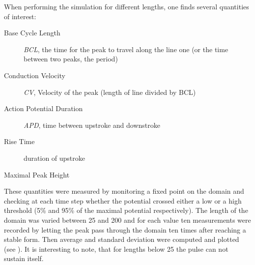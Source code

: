 When performing the simulation for different lengths, one finds several
quantities of interest:
\begin{description}
    \item[Base Cycle Length] \emph{BCL}, the time for the peak to travel along
        the line one (or the time between two peaks, the period)
    \item[Conduction Velocity] \emph{CV}, Velocity of the peak (length of line
        divided by BCL)
    \item[Action Potential Duration] \emph{APD}, time between upstroke and
        downstroke
    \item[Rise Time] duration of upstroke
    \item[Maximal Peak Height]
\end{description}

These quantities were measured by monitoring a fixed point on the domain and
checking at each time step whether the potential crossed either a low or a high
threshold (5\% and 95\% of the maximal potential respectively).
The length of the domain was varied between 25 and 200 and for each value ten
measurements were recorded by letting the peak pass through the domain ten times after
reaching a stable form. Then average and standard deviation were computed and
plotted (see ).
It is interesting to note, that for lengths below 25 the pulse can not sustain
itself.

